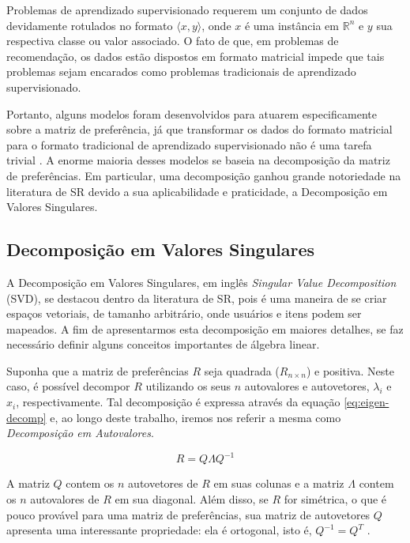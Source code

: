 Problemas de aprendizado supervisionado requerem um conjunto de dados devidamente rotulados no formato $ \langle x,y \rangle$, onde $x$ é uma instância em $\mathbb{R}^n$ e $y$ sua respectiva classe ou valor associado. O fato de que, em problemas de recomendação, os dados estão dispostos em formato matricial impede que tais problemas sejam encarados como problemas tradicionais de aprendizado supervisionado.

Portanto, alguns modelos foram desenvolvidos para atuarem especificamente sobre a matriz de preferência, já que transformar os dados do formato matricial para o formato tradicional de aprendizado supervisionado não é uma tarefa trivial \citep{braida:2013}. A enorme maioria desses modelos se baseia na decomposição da matriz de preferências. Em particular, uma decomposição ganhou grande notoriedade na literatura de SR devido a sua aplicabilidade e praticidade, a Decomposição em Valores Singulares. 

\subsection{Decomposição em Valores Singulares}
\label{sec:svd}
A Decomposição em Valores Singulares, em inglês \textit{Singular Value Decomposition} (SVD), se destacou dentro da literatura de SR, pois é uma maneira de se criar espaços vetoriais, de tamanho arbitrário, onde usuários e itens podem ser mapeados. A fim de apresentarmos esta decomposição em maiores detalhes, se faz necessário definir alguns conceitos importantes de álgebra linear.

Suponha que a matriz de preferências $R$ seja quadrada ($R_{n \times n}$) e positiva. Neste caso, é possível decompor $R$ utilizando os seus $n$ autovalores e autovetores, $\lambda_i$ e $x_i$, respectivamente. Tal decomposição é expressa através da equação \ref{eq:eigen-decomp} e, ao longo deste trabalho, iremos nos referir a mesma como \textit{Decomposição em Autovalores}. 

\begin{equation}
R = Q \Lambda Q^{-1}
\label{eq:eigen-decomp}
\end{equation}

A matriz $Q$ contem os $n$ autovetores de $R$ em suas colunas e a matriz $\Lambda$ contem os $n$ autovalores de $R$ em sua diagonal. Além disso, se $R$ for simétrica, o que é pouco provável para uma matriz de preferências, sua matriz de autovetores $Q$ apresenta uma interessante propriedade: ela é ortogonal, isto é, $Q^{-1}=Q^{T}$ \citep{strang09}. 

